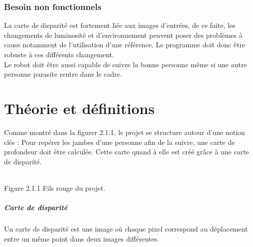 \documentclass[12pt,a4paper]{report}
\begin{document}
\subsection{Besoin non fonctionnels}
	La carte de disparité est fortement liée aux images d'entrées, de ce faite, les changements de luminosité et d'environnement peuvent poser des problèmes à cause notamment de l'utilisation d'une référence.
	Le programme doit donc être robuste à ces différents changement.\\
	Le robot doit être aussi capable de suivre la bonne personne même si une autre personne parasite rentre dans le cadre.
	
\chapter{Théorie et définitions}

Comme montré dans la figurer 2.1.1, le projet se structure autour d'une notion clés : Pour repérer les jambes d'une personne afin de la suivre, une carte de profondeur doit être calculée. Cette carte quand à elle est créé grâce à une carte de disparité. 

\begin{center}
\\
Figure 2.1.1 Fils rouge du projet.
\end{center}

\paragraph{Carte de disparité}
Un carte de disparité est une image où chaque pixel correspond au déplacement entre un même point dans deux images différentes. 
\end{document}
